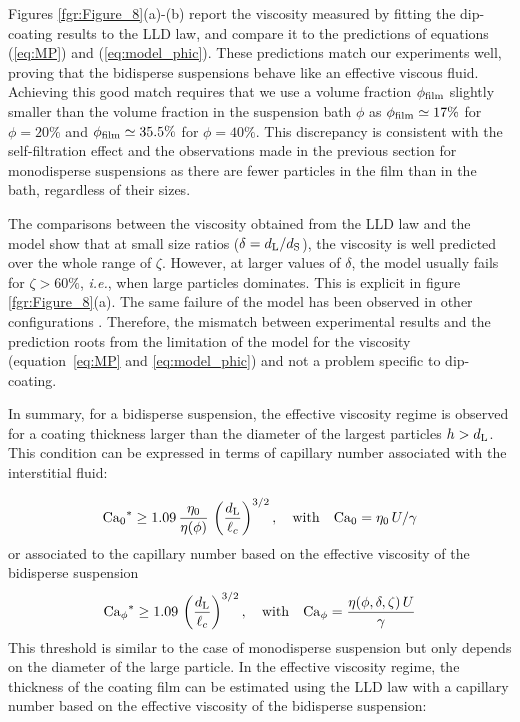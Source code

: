 \documentclass{jfm}
\begin{document}
Figures \ref{fgr:Figure_8}(a)-(b) report the viscosity measured by fitting the dip-coating results to the LLD law, and compare it to the predictions of equations (\ref{eq:MP}) and (\ref{eq:model_phic}). These predictions match our experiments well, proving that the bidisperse suspensions behave like an effective viscous fluid. Achieving this good match requires that we use a volume fraction $\phi_{\rm film}$ slightly smaller than the volume fraction in the suspension bath $\phi$ as $\phi_{\rm film} \simeq 17\%$ for $\phi=20\%$ and $\phi_{\rm film} \simeq 35.5\%$ for $\phi=40\%$. This discrepancy is consistent with the self-filtration effect \cite[][]{kulkarni2010particle} and the observations made in the previous section for monodisperse suspensions as there are fewer particles in the film than in the bath, regardless of their sizes.

The comparisons between the viscosity obtained from the LLD law and the model show that at small size ratios ($\delta = d_{\rm L}/d_{\rm S}$), the viscosity is well predicted over the whole range of $\zeta$. However, at larger values of $\delta$, the model usually fails for $\zeta>60\%$, \textit{i.e.}, when large particles dominates. This is explicit in figure \ref{fgr:Figure_8}(a). The same failure of the model has been observed in other configurations \cite[][]{gondret1997dynamic,thievenaz2021pinch}. Therefore, the mismatch between experimental results and the prediction roots from the limitation of the model for the viscosity (equation~\ref{eq:MP} and \ref{eq:model_phic}) and not a problem specific to dip-coating.

In summary, for a bidisperse suspension, the effective viscosity regime is observed for a coating thickness larger than the diameter of the largest particles $h > d_{\rm L}$. This condition can be expressed in terms of capillary number associated with the interstitial fluid:

\begin{equation}
    {{\rm Ca}_0}^* \geq 1.09\,\frac{\eta_0}{\eta(\phi)}\,\left(\frac{d_{\rm L}}{\ell_c}\right)^{3/2},
    \quad {\rm with} \quad {\rm Ca}_0=\eta_0\,U/\gamma
\end{equation}
%
or associated to the capillary number based on the effective viscosity of the bidisperse suspension
%
\begin{equation}
    {{\rm Ca}_\phi}^* \geq 1.09\,\left(\frac{d_{\rm L}}{\ell_c}\right)^{3/2}, 
    \quad {\rm with} \quad {\rm Ca}_\phi=\frac{\eta(\phi,\delta,\zeta)\,U}{\gamma}
\end{equation}
%
This threshold is similar to the case of monodisperse suspension \cite[][]{gans2019dip,palma2019dip} but only depends on the diameter of the large particle. In the effective viscosity regime, the thickness of the coating film can be estimated using the LLD law with a capillary number based on the effective viscosity of the bidisperse suspension:
\end{document}
